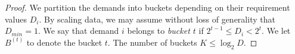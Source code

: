 \documentclass{article}[11pt]
\newcommand{\barcalS}{\bar{\cal S}\xspace}
\newcommand{\bc}{{\bar c}}
\newcommand{\brt}{{(t)}}
\newcommand{\barD}{\bar{D}}
\begin{document}
\begin{proof}
	We partition the demands into buckets depending on their requirement values $D_i$. By scaling data, we may assume without loss of generality that $D_{min} = 1$. 
	We say that demand $i$ belongs to \emph{bucket $t$} if $2^{t-1} \leq D_i < 2^t$. We let $B^\brt$ to denote the bucket $t$. The number of buckets $K \leq \log_2 D$.
	

\end{proof}
\end{document}
